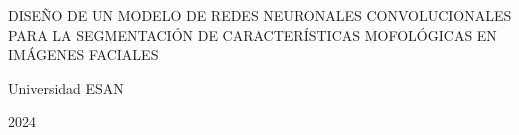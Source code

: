 \begin{center}
	{DISEÑO DE UN MODELO DE REDES NEURONALES CONVOLUCIONALES PARA LA SEGMENTACIÓN DE CARACTERÍSTICAS MOFOLÓGICAS EN IMÁGENES FACIALES}
\end{center}

\vspace{3cm}

\rightline{\fillin[9cm]}
\vspace{3cm}

\rightline{\fillin[9cm]}
\vspace{3cm}

\rightline{\fillin[9cm]}
\vspace{3cm}

\centerline{Universidad ESAN}
\centerline{2024}